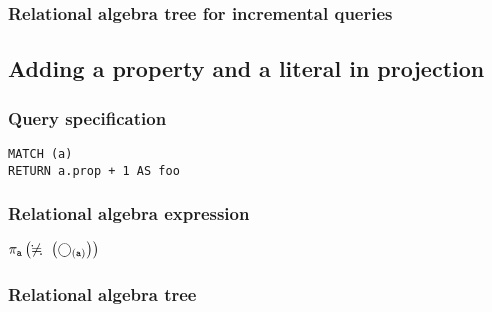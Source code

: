 
\subsubsection*{Relational algebra tree for incremental queries}


\subsection{Adding a property and a literal in projection}

\subsubsection*{Query specification}

\begin{lstlisting}
MATCH (a)
RETURN a.prop + 1 AS foo
\end{lstlisting}

\subsubsection*{Relational algebra expression}

$\projection{\var{a}} \left(\alldifferent{} \left(\getvertices{a}{}\right)\right)$

\subsubsection*{Relational algebra tree}


